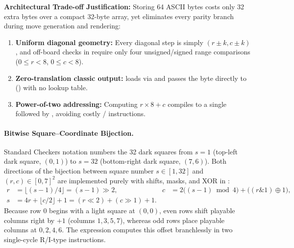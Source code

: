 \textbf{Architectural Trade-off Justification:} Storing 64 ASCII bytes costs only 32 extra bytes over a compact 32-byte array, yet eliminates every parity branch during move generation and rendering:
\begin{enumerate}
    \item \textbf{Uniform diagonal geometry:} Every diagonal step is simply $(r \pm k, c \pm k)$, and off-board checks in  require only four unsigned/signed range comparisons ($0 \le r < 8$, $0 \le c < 8$).
    \item \textbf{Zero-translation classic output:}  loads  via  and passes the byte directly to  () with no lookup table.
    \item \textbf{Power-of-two addressing:} Computing $r \times 8 + c$ compiles to a single  followed by , avoiding costly / instructions.
\end{enumerate}

\paragraph{Bitwise Square--Coordinate Bijection.}
Standard Checkers notation numbers the 32 dark squares from $s = 1$ (top-left dark square, $(0,1)$) to $s = 32$ (bottom-right dark square, $(7,6)$). Both directions of the bijection between square number $s \in [1, 32]$ and $(r, c) \in [0, 7]^2$ are implemented purely with shifts, masks, and XOR in :
\begin{align}
    r &= \lfloor (s - 1) / 4 \rfloor = (s - 1) \gg 2, &
    c &= 2\big((s - 1) \bmod 4\big) + \big((r \mathbin{\&} 1) \oplus 1\big), \label{eq:sq2rc}\\
    s &= 4r + \lfloor c / 2 \rfloor + 1 = (r \ll 2) + (c \gg 1) + 1. \label{eq:idx2sq}
\end{align}
Because row $0$ begins with a light square at $(0,0)$, even rows shift playable columns right by $+1$ (columns $1,3,5,7$), whereas odd rows place playable columns at $0,2,4,6$. The expression  computes this offset branchlessly in two single-cycle R/I-type instructions.

